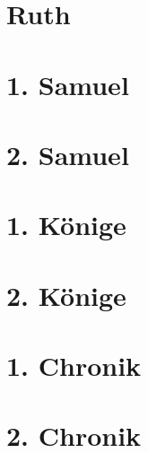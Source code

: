 \chapter{Ruth}
\begin{multicols}{2}
  \raggedcolumns
  \parskip=0pt \relax
  
\end{multicols}

\chapter{1. Samuel}
\begin{multicols}{2}
  \raggedcolumns
  \parskip=0pt \relax
  
\end{multicols}

\chapter{2. Samuel}
\begin{multicols}{2}
  \raggedcolumns
  \parskip=0pt \relax
  
\end{multicols}

\chapter{1. Könige}
\begin{multicols}{2}
  \raggedcolumns
  \parskip=0pt \relax
  
\end{multicols}

\chapter{2. Könige}
\begin{multicols}{2}
  \raggedcolumns
  \parskip=0pt \relax
  
\end{multicols}

\chapter{1. Chronik}
\begin{multicols}{2}
  \raggedcolumns
  \parskip=0pt \relax
  
\end{multicols}

\chapter{2. Chronik}
\begin{multicols}{2}
  \raggedcolumns
  \parskip=0pt \relax
  
\end{multicols}

